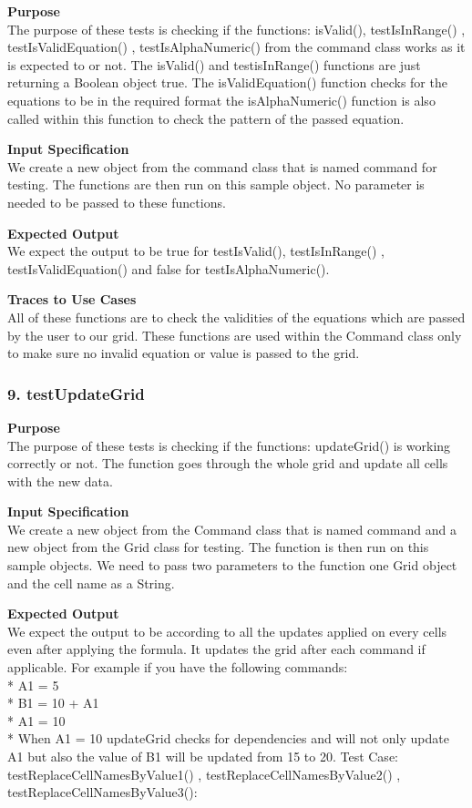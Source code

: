 \documentclass[12pt]{article}
\begin{document}
\noindent
{\bf Purpose}\\
The purpose of these tests is checking if the functions: isValid(), testIsInRange() , testIsValidEquation() , testIsAlphaNumeric() from the command class works as it is expected to or not. The isValid() and testisInRange() functions are just returning a Boolean object true. The isValidEquation() function checks for the equations to be in the required format the isAlphaNumeric() function is also called within this function to check the pattern of the passed equation. 

\noindent
{\bf Input Specification}\\
We create a new object from the command class that is named command for testing. The functions are then run on this sample object. No parameter is needed to be passed to these functions.  

\noindent
{\bf Expected Output}\\
We expect the output to be true for testIsValid(), testIsInRange() , testIsValidEquation() and false for  testIsAlphaNumeric().

\noindent
{\bf Traces to Use Cases}\\
All of these functions are to check the validities of the equations which are passed by the user to our grid. These functions are used within the Command class only to make sure no invalid equation or value is passed to the grid. 

\subsubsection{9. testUpdateGrid} \label{tc:1}

\noindent
{\bf Purpose}\\
The purpose of these tests is checking if the functions: updateGrid() is working correctly or not. The function goes through the whole grid and update all cells with the new data.

\noindent
{\bf Input Specification}\\
We create a new object from the Command class that is named command and a new object from the Grid class for testing. The function is then run on this sample objects. We need to pass two parameters to the function one Grid object and the cell name as a String. 

\noindent
{\bf Expected Output}\\
We expect the output to be according to all the updates applied on every cells even after applying the formula. It updates the grid after each command if applicable. For example if you have the following commands:\\*
A1 = 5\\*
B1 = 10 + A1\\*
A1 = 10\\*
When A1 = 10 updateGrid checks for dependencies and will not only update A1 but also the value of B1 will be updated from 15 to 20.
Test Case: testReplaceCellNamesByValue1() , testReplaceCellNamesByValue2() , testReplaceCellNamesByValue3():
\end{document}
